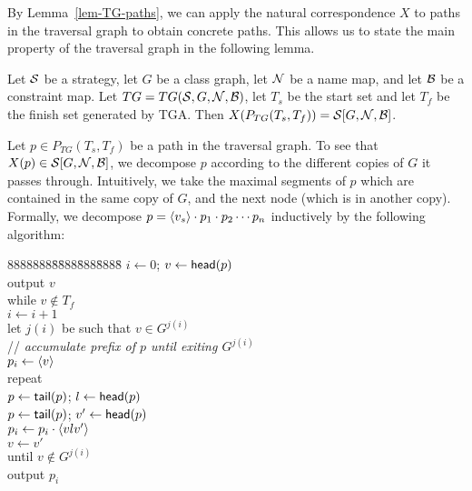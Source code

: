 By Lemma~\ref{lem-TG-paths}, we can apply the natural correspondence
$X$ to paths in the traversal graph to obtain concrete paths.  This
allows us to state the main property of the traversal graph in the
following lemma.
\begin{lemma}
\label{lem-TG}
Let ${\cal S}$ be a strategy, let $G$ be a class graph, let ${\cal N}$ be a name
map, and let ${\cal B}$ be a constraint map.  Let $TG={\sl TG}({\cal S},G,{\cal N},{\cal B})$,
let $T_s$ be the start set and let $T_f$ be the finish set generated
by TGA.  Then $X(P_{TG}(T_s,T_f))={\cal S}[G,{\cal N},{\cal B}]$.
\end{lemma}
\Proof
Let $p\in P_{TG}(T_s,T_f)$ be a path in the traversal graph.  To see
that $X(p)\in {\cal S}[G,{\cal N},{\cal B}]$, we decompose $p$ according to the
different copies of $G$ it passes through.  Intuitively, we take the
maximal segments of $p$ which are contained in the same copy of $G$,
and the next node (which is in another copy).  Formally, we decompose
$p=\left\langle v_s \right\rangle\cdot p_1\cdot p_2\cdots p_n$ inductively by the following
algorithm:

{
\begin{tabbing}
88888888\=\=888\=888\=8888\=\kill
$i\gets 0$; $v\gets\mbox{\sf head}(p)$\\
output $v$\\
while $v\not\in T_f$\\
\> $i\gets i+1$\\
\>let $j(i)$ be such that $v\in G^{j(i)}$\\
\> // {\em accumulate prefix of $p$ until exiting $G^{j(i)}$}\\
\> $p_i\gets\left\langle v \right\rangle$\\
\> repeat\\
\>\> $p\gets\mbox{\sf tail}(p)$; $l\gets\mbox{\sf head}(p)$\\
\>\> $p\gets\mbox{\sf tail}(p)$; $v'\gets\mbox{\sf head}(p)$\\
\>\> $p_i\gets p_i\cdot\left\langle vlv' \right\rangle$\\
\>\> $v\gets v'$\\
\>until $v\notin G^{j(i)}$\\
\> output $p_i$\\
\end{tabbing}
}

